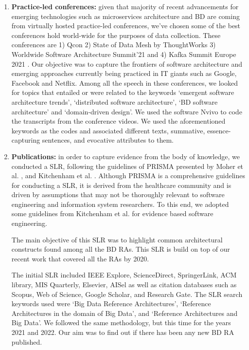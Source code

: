 \documentclass{bmcart}
\begin{document}
\begin{enumerate}
    \item{\bf{Practice-led conferences:}} given that majority of recent advancements for emerging technologies such as microservices architecture \cite{gan2019open, laigner2021data, laigner2021data} and BD are coming from virtually hosted practice-led conferences, we've chosen some of the best conferences hold world-wide for the purposes of data collection. These conferences are 1) Qcon \cite{QCON} 2) State of Data Mesh by ThoughtWorks \cite{ThoughtWorks} 3) Worldwide Software Architecture Summit'21 \cite{Geekle} and 4) Kafka Summit Europe 2021 \cite{KafkaSummit}. Our objective was to capture the frontiers of software architecture and emerging approaches currently being practiced in IT giants such as Google, Facebook and Netflix. Among all the speech in these conferences, we looked for topics that entailed or were related to the keywords `emergent software architecture trends', `distributed software architecture', `BD software architecture' and `domain-driven design'. We used the software Nvivo to code the transcripts from the conference videos. We used the aforementioned keywords as the codes and associated different texts, summative, essence-capturing sentences, and evocative attributes to them.
    
    \item{\bf{Publications:}} in order to capture evidence from the body of knowledge, we conducted a SLR, following the guidelines of PRISMA presented by Moher et al. \cite{moher2015preferred}, and Kitchenham et al. \cite{kitchenham2015evidence}. Although PRISMA is a comprehensive guidelines for conducting a SLR, it is derived from the healthcare community and is driven by assumptions that may not be thoroughly relevant to software engineering and information system researchers. To this end, we adopted some guidelines from Kitchenham et al. for evidence based software engineering.
    
    The main objective of this SLR was to highlight common architectural constructs found among all the BD RAs. This SLR is build on top of our recent work \cite{AtaeiACIS} that covered all the RAs by 2020.

    The initial SLR included IEEE Explore, ScienceDirect, SpringerLink, ACM library, MIS Quarterly, Elsevier, AISel as well as citation databases such as Scopus, Web of Science, Google Scholar, and Research Gate. The SLR search keywords used were `Big Data Reference Architectures’, `Reference Architectures in the domain of Big Data’, and `Reference Architectures and Big Data’. We followed the same methodology, but this time for the years 2021 and 2022. Our aim was to find out if there has been any new BD RA published.


\end{enumerate}
\end{document}
